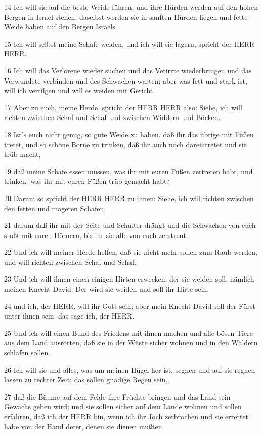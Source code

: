 \par 14 Ich will sie auf die beste Weide führen, und ihre Hürden werden auf den hohen Bergen in Israel stehen; daselbst werden sie in sanften Hürden liegen und fette Weide haben auf den Bergen Israels.
\par 15 Ich will selbst meine Schafe weiden, und ich will sie lagern, spricht der HERR HERR.
\par 16 Ich will das Verlorene wieder suchen und das Verirrte wiederbringen und das Verwundete verbinden und des Schwachen warten; aber was fett und stark ist, will ich vertilgen und will es weiden mit Gericht.
\par 17 Aber zu euch, meine Herde, spricht der HERR HERR also: Siehe, ich will richten zwischen Schaf und Schaf und zwischen Widdern und Böcken.
\par 18 Ist's euch nicht genug, so gute Weide zu haben, daß ihr das übrige mit Füßen tretet, und so schöne Borne zu trinken, daß ihr auch noch dareintretet und sie trüb macht,
\par 19 daß meine Schafe essen müssen, was ihr mit euren Füßen zertreten habt, und trinken, was ihr mit euren Füßen trüb gemacht habt?
\par 20 Darum so spricht der HERR HERR zu ihnen: Siehe, ich will richten zwischen den fetten und mageren Schafen,
\par 21 darum daß ihr mit der Seite und Schulter drängt und die Schwachen von euch stoßt mit euren Hörnern, bis ihr sie alle von euch zerstreut.
\par 22 Und ich will meiner Herde helfen, daß sie nicht mehr sollen zum Raub werden, und will richten zwischen Schaf und Schaf.
\par 23 Und ich will ihnen einen einigen Hirten erwecken, der sie weiden soll, nämlich meinen Knecht David. Der wird sie weiden und soll ihr Hirte sein,
\par 24 und ich, der HERR, will ihr Gott sein; aber mein Knecht David soll der Fürst unter ihnen sein, das sage ich, der HERR.
\par 25 Und ich will einen Bund des Friedens mit ihnen machen und alle bösen Tiere aus dem Land ausrotten, daß sie in der Wüste sicher wohnen und in den Wäldern schlafen sollen.
\par 26 Ich will sie und alles, was um meinen Hügel her ist, segnen und auf sie regnen lassen zu rechter Zeit; das sollen gnädige Regen sein,
\par 27 daß die Bäume auf dem Felde ihre Früchte bringen und das Land sein Gewächs geben wird; und sie sollen sicher auf dem Lande wohnen und sollen erfahren, daß ich der HERR bin, wenn ich ihr Joch zerbrochen und sie errettet habe von der Hand derer, denen sie dienen mußten.
